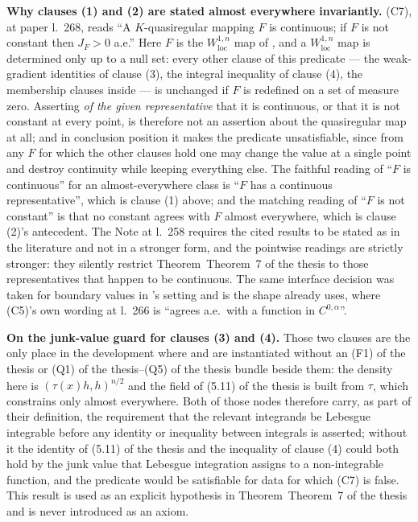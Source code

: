 \begin{definition}
\medskip
\noindent\textbf{Why clauses (1) and (2) are stated almost everywhere
invariantly.}  (C7), at paper l.~268, reads ``A $K$-quasiregular mapping $F$ is
continuous; if $F$ is not constant then $J_F>0$ a.e.''  Here $F$ is the
$W^{1,n}_{\mathrm{loc}}$ map of , and a
$W^{1,n}_{\mathrm{loc}}$ map is determined only up to a null set: every other
clause of this predicate --- the weak-gradient identities of clause (3), the
integral inequality of clause (4), the membership clauses inside
 --- is unchanged if $F$ is redefined on a set of
measure zero.  Asserting \emph{of the given representative} that it is
continuous, or that it is not constant at every point, is therefore not an
assertion about the quasiregular map at all; and in conclusion position it makes
the predicate unsatisfiable, since from any $F$ for which the other clauses hold
one may change the value at a single point and destroy continuity while keeping
everything else.  The faithful reading of ``$F$ is continuous'' for an
almost-everywhere class is ``$F$ has a continuous representative'', which is
clause (1) above; and the matching reading of ``$F$ is not constant'' is that no
constant agrees with $F$ almost everywhere, which is clause (2)'s antecedent.
The Note at l.~258 requires the cited results to be stated as in the literature
and not in a stronger form, and the pointwise readings are strictly stronger:
they silently restrict Theorem~Theorem~7 of the thesis to those representatives that happen
to be continuous.  The same interface decision was taken for boundary values in
's setting and is the shape
 already uses, where (C5)'s own wording at
l.~266 is ``agrees a.e.\ with a function in $C^{0,\alpha}$''.

\noindent\textbf{On the junk-value guard for clauses (3) and (4).}  Those two
clauses are the only place in the development where
 and  are instantiated
without an (F1) of the thesis or (Q1) of the thesis--(Q5) of the thesis bundle beside them: the
density here is $(\tau(x)h,h)^{n/2}$ and the field of (5.11) of the thesis is built
from $\tau$, which  constrains only almost
everywhere.  Both of those nodes therefore carry, as part of their definition,
the requirement that the relevant integrands be Lebesgue integrable before any
identity or inequality between integrals is asserted; without it the identity of
(5.11) of the thesis and the inequality of clause (4) could both hold by the junk
value that Lebesgue integration assigns to a non-integrable function, and the
predicate would be satisfiable for data for which (C7) is false.  This result is
used as an
explicit hypothesis in Theorem~Theorem~7 of the thesis and is never introduced as an axiom.
\end{definition}
